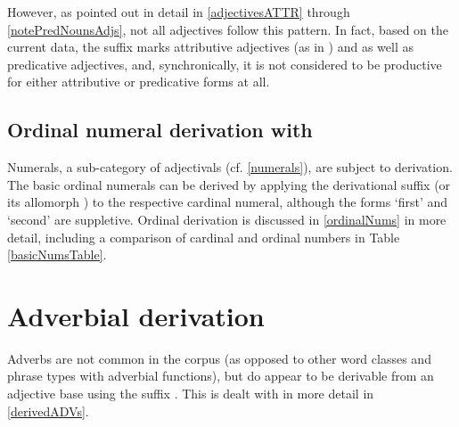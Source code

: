 However, as pointed out in detail in \SEC\ref{adjectivesATTR} through \SEC\ref{notePredNounsAdjs}, not all adjectives follow this pattern. In fact, based on the current data, the  suffix marks attributive adjectives (as in ) and as well as predicative adjectives, %
and, synchronically, it is not considered to be productive for either attributive or predicative forms at all. 



\subsection{Ordinal numeral derivation with }\label{ordNUMderiv}
Numerals, a sub-category of adjectivals (cf. \SEC\ref{numerals}), are subject to derivation. 
The basic ordinal numerals can be derived by applying the derivational suffix  (or its allomorph ) %
to the respective cardinal numeral, although the forms  ‘first’ and  ‘second’ are suppletive. Ordinal derivation is discussed in \SEC\ref{ordinalNums} in more detail, including a comparison of cardinal and ordinal numbers in Table \vref{basicNumsTable}. 





\section{Adverbial derivation}\label{advDerivation}
Adverbs are not common in the corpus (as opposed to other word classes and phrase types with adverbial functions), but do appear to be derivable from an adjective base using the suffix . This is dealt with in more detail in \SEC\ref{derivedADVs}. 






